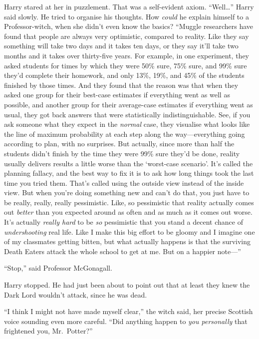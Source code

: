 Harry stared at her in puzzlement. That was a self-evident axiom.
``Well\ldots{}'' Harry said slowly. He tried to organise his thoughts.
How \emph{could} he explain himself to a Professor-witch, when she
didn't even know the basics? ``Muggle researchers have found that people
are always very optimistic, compared to reality. Like they say something
will take two days and it takes ten days, or they say it'll take two
months and it takes over thirty-five years. For example, in one
experiment, they asked students for times by which they were 50\% sure,
75\% sure, and 99\% sure they'd complete their homework, and only 13\%,
19\%, and 45\% of the students finished by those times. And they found
that the reason was that when they asked one group for their best-case
estimates if everything went as well as possible, and another group for
their average-case estimates if everything went as usual, they got back
answers that were statistically indistinguishable. See, if you ask
someone what they expect in the \emph{normal} case, they visualise what
looks like the line of maximum probability at each step along the
way---everything going according to plan, with no surprises. But
actually, since more than half the students didn't finish by the time
they were 99\% sure they'd be done, reality usually delivers results a
little worse than the `worst-case scenario'. It's called the planning
fallacy, and the best way to fix it is to ask how long things took the
last time you tried them. That's called using the outside view instead
of the inside view. But when you're doing something new and can't do
that, you just have to be really, really, really pessimistic. Like, so
pessimistic that reality actually comes out \emph{better} than you
expected around as often and as much as it comes out worse. It's
actually \emph{really hard} to be \emph{so} pessimistic that you stand a
decent chance of \emph{undershooting} real life. Like I make this big
effort to be gloomy and I imagine one of my classmates getting bitten,
but what actually happens is that the surviving Death Eaters attack the
whole school to get at me. But on a happier note---''

``Stop,'' said Professor McGonagall.

Harry stopped. He had just been about to point out that at least they
knew the Dark Lord wouldn't attack, since he was dead.

``I think I might not have made myself clear,'' the witch said, her
precise Scottish voice sounding even more careful. ``Did anything happen
to \emph{you personally} that frightened you, Mr.~Potter?''

